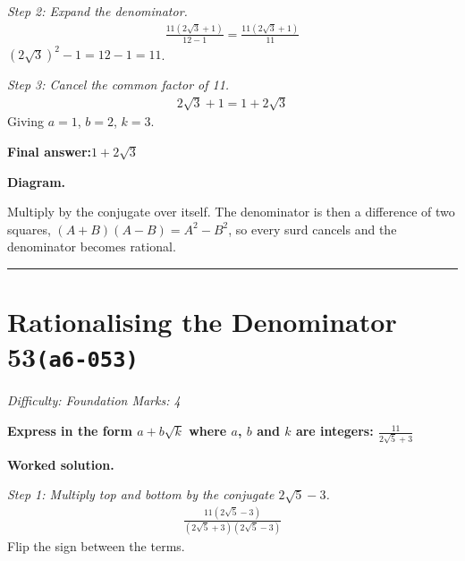 \documentclass[11pt]{article}
\newcommand{\question}[1]{\par\medskip\noindent\textbf{#1}\par}
\begin{document}
\textit{Step 2: Expand the denominator.}
\[\begin{gathered}
\frac{11(2\sqrt{3} + 1)}{12 - 1} = \frac{11(2\sqrt{3} + 1)}{11}
\end{gathered}\]
\( (2\sqrt{3})^2 - 1 = 12 - 1 = 11 \).

\textit{Step 3: Cancel the common factor of 11.}
\[\begin{gathered}
2\sqrt{3} + 1 = 1 + 2\sqrt{3}
\end{gathered}\]
Giving \( a = 1 \), \( b = 2 \), \( k = 3 \).

\begin{answerbox}
\textbf{Final answer:}\quad \(\displaystyle 1 + 2\sqrt{3}\)
\end{answerbox}
\textbf{Diagram.}

\begin{center}
\end{center}
\small Multiply by the conjugate over itself. The denominator is then a difference of two squares, $(A+B)(A-B)=A^{2}-B^{2}$, so every surd cancels and the denominator becomes rational.\normalsize

\medskip\hrule

\section*{Rationalising the Denominator 53\quad\small\texttt{(a6-053)}}
\textit{Difficulty: Foundation \quad\textbar\quad Marks: 4}

\question{Express in the form \( a + b\sqrt{k} \) where \( a \), \( b \) and \( k \) are integers: \( \frac{11}{2\sqrt{5} + 3} \)}

\textbf{Worked solution.}

\textit{Step 1: Multiply top and bottom by the conjugate \( 2\sqrt{5} - 3 \).}
\[\begin{gathered}
\frac{11(2\sqrt{5} - 3)}{(2\sqrt{5} + 3)(2\sqrt{5} - 3)}
\end{gathered}\]
Flip the sign between the terms.
\end{document}

